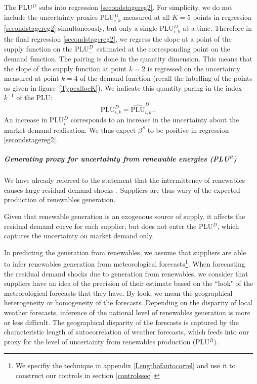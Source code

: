 The PLU$^{D}$ subs into regression \ref{secondstagereg2}. 
For simplicity, we do not include the uncertainty proxies PLU$^D_{i,k}$ measured at all $K=5$ points in regression \ref{secondstagereg2} simultaneously, but only a single PLU$^D_{i,k}$ at a time. 
Therefore in the final regression \ref{secondstagereg2}, we regress the slope at a point of the supply function on the PLU$^D_{.,.}$ estimated at the corresponding point on the demand function. The pairing is done in the quantity dimension. This means that the slope of the supply function at point $k=2$ is regressed on the uncertainty measured at point $k=4$ of the demand function (recall the labelling of the points as given in figure~\ref{TypeallocK}). We indicate this quantity paring in the index $k^{-1}$ of the PLU:
\begin{equation}
\label{levelproxy}
\text{PLU}^D_{i,k} = 
\widehat{\text{PLU}}^D_{i,k^{-1}} 
\end{equation}
An increase in PLU$^D_i$ corresponds to an increase in the uncertainty about the market demand realisation. We thus expect $\beta^S$ to be positive in regression \ref{secondstagereg2}.


\subparagraph{Generating proxy for uncertainty from renewable energies (PLU$^R$)}
\label{proxyautocorrel}

We have already referred to the statement that the intermittency of renewables causes large residual demand shocks \cite{epexwebsite1}. Suppliers are thus wary of the expected production of renewables generation. 

Given that renewable generation is an exogenous source of supply, it affects the residual demand curve for each supplier, but does not enter the PLU$^D$, which captures the uncertainty on market demand only. 

In predicting the generation from renewables, we assume that suppliers are able to infer renewables generation from meteorological forecasts\footnote{We specifiy the technique in appendix \ref{Lengthofautocorrel} and use it to construct our controls in section \ref{controlssec}.}.
When forecasting the residual demand shocks due to generation from renewables, we consider that suppliers have an idea of the precision of their estimate based on the ``look" of the meteorological forecasts that they have. By look, we mean the geographical heterogeneity or homogeneity of the forecasts. Depending on the disparity of local weather forecasts, inference of the national level of renewables generation is more or less difficult. The geographical disparity of the forecasts is captured by the characteristic length of autocorrelation of weather forecasts, which feeds into our proxy for the level of uncertainty from renewables production (PLU$^R$). 

